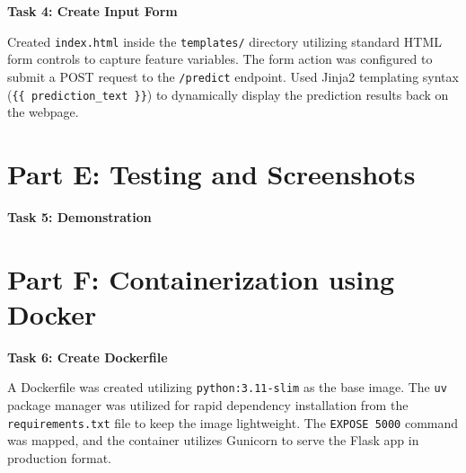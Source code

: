 \documentclass[12pt,a4paper]{article}
\begin{document}
\begin{tcolorbox}
\textbf{Task 4: Create Input Form}

Created \texttt{index.html} inside the \texttt{templates/} directory utilizing standard HTML form controls to capture feature variables. The form action was configured to submit a POST request to the \texttt{/predict} endpoint. Used Jinja2 templating syntax (\texttt{\{\{ prediction\_text \}\}}) to dynamically display the prediction results back on the webpage.

\end{tcolorbox}


\section*{Part E: Testing and Screenshots}

\begin{tcolorbox}
\textbf{Task 5: Demonstration}

\begin{center}


\vspace{1cm}


\vspace{1cm}

\end{center}

\end{tcolorbox}


\section*{Part F: Containerization using Docker}

\begin{tcolorbox}
\textbf{Task 6: Create Dockerfile}

A Dockerfile was created utilizing \texttt{python:3.11-slim} as the base image. The \texttt{uv} package manager was utilized for rapid dependency installation from the \texttt{requirements.txt} file to keep the image lightweight. The \texttt{EXPOSE 5000} command was mapped, and the container utilizes Gunicorn to serve the Flask app in production format.

\end{tcolorbox}

\vspace{6pt}
\end{document}
